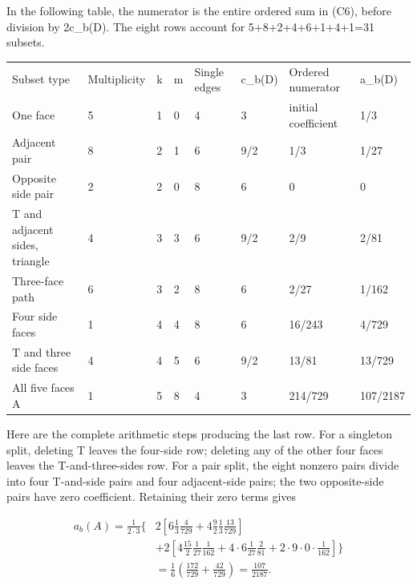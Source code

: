 \documentclass[11pt]{article}
\begin{document}
In the following table, the numerator is the entire ordered sum in (C6), before division by 2c\_b(D). The eight rows account for 5+8+2+4+6+1+4+1=31 subsets.

\begingroup\small\setlength{\tabcolsep}{3pt}\begin{longtable}{@{}p{}p{}p{}p{}p{}p{}p{}p{}@{}}\toprule
Subset type & Multiplicity & k & m & Single edges & c\_b(D) & Ordered numerator & a\_b(D)\\
One face & 5 & 1 & 0 & 4 & 3 & initial coefficient & 1/3\\
Adjacent pair & 8 & 2 & 1 & 6 & 9/2 & 1/3 & 1/27\\
Opposite side pair & 2 & 2 & 0 & 8 & 6 & 0 & 0\\
T and adjacent sides, triangle & 4 & 3 & 3 & 6 & 9/2 & 2/9 & 2/81\\
Three-face path & 6 & 3 & 2 & 8 & 6 & 2/27 & 1/162\\
Four side faces & 1 & 4 & 4 & 8 & 6 & 16/243 & 4/729\\
T and three side faces & 4 & 4 & 5 & 6 & 9/2 & 13/81 & 13/729\\
All five faces A & 1 & 5 & 8 & 4 & 3 & 214/729 & 107/2187\\
\bottomrule\end{longtable}\endgroup

Here are the complete arithmetic steps producing the last row. For a singleton split, deleting T leaves the four-side row; deleting any of the other four faces leaves the T-and-three-sides row. For a pair split, the eight nonzero pairs divide into four T-and-side pairs and four adjacent-side pairs; the two opposite-side pairs have zero coefficient. Retaining their zero terms gives

\[
\begin{aligned}
 a_b(A)=\frac1{2\cdot3}\Biggl\{&
 2\left[6\frac13\frac4{729}
       +4\frac92\frac13\frac{13}{729}\right]\\
 &+2\left[4\frac{15}2\frac1{27}\frac1{162}
       +4\cdot6\frac1{27}\frac2{81}
       +2\cdot9\cdot0\cdot\frac1{162}\right]\Biggr\}\\
 &=\frac1{6}\left(\frac{172}{729}+\frac{42}{729}\right)
 =\frac{107}{2187}.
\end{aligned}
\tag{C9}
\]
\end{document}
